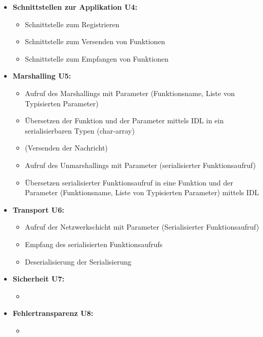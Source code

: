 \begin{itemize}
	\item \textbf{Schnittstellen zur Applikation U4:}\\
	\begin{itemize}
		\item Schnittstelle zum Registrieren
		\item Schnittstelle zum Versenden von Funktionen
		\item Schnittstelle zum Empfangen von Funktionen
	\end{itemize}
	
	\item \textbf{Marshalling U5:}\\
	\begin{itemize}
		\item Aufruf des Marshallings mit Parameter (Funktionsname, Liste von Typisierten Parameter)
		\item Übersetzen der Funktion und der Parameter mittels IDL in ein serialisierbaren Typen (char-array)
		\item (Versenden der Nachricht)
		\item Aufruf des Unmarshallings mit Parameter (serialisierter Funktionsaufruf)
		\item Übersetzen serialisierter Funktionsaufruf in eine Funktion und der Parameter (Funktionsname, Liste von Typisierten Parameter) mittels IDL
	\end{itemize}
	
	\item \textbf{Transport U6:}\\
	\begin{itemize}
		\item Aufruf der Netzwerkschicht mit Parameter (Serialisierter Funktionsaufruf)
		\item Empfang des serialisierten Funktionsaufrufs
		\item Deserialisierung der Serialisierung
	\end{itemize}
	
	\item \textbf{Sicherheit U7:}\\
	\begin{itemize}
		\item 
	\end{itemize}
	
	\item \textbf{Fehlertransparenz U8:}\\
	\begin{itemize}
		\item 
	\end{itemize}
	

\end{itemize}
